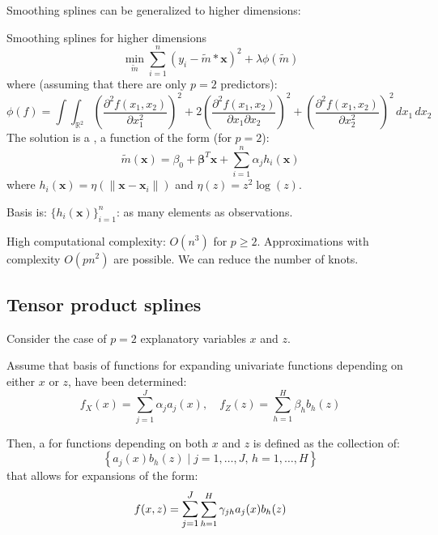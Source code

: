 Smoothing splines can be generalized to higher dimensions:
\begin{problem}{Smoothing splines for higher dimensions}{}
    \begin{equation*}
        \min_{\tilde m} \sum_{i=1}^n  \left( y_i - \tilde m*\boldsymbol x \right)^2 + \lambda \phi (\tilde m)
    \end{equation*}
    where (assuming that there are only $p=2$ predictors):
    \begin{equation*}
        \phi(f) = \int \int_{\mathbb R^2}
            \left( \frac{\partial^2 f(x_1, x_2)}{\partial x_1^2} \right)^2
            + 2 \left( \frac{\partial^2 f(x_1, x_2)}{\partial x_1 \partial x_2} \right)^2
            + \left( \frac{\partial^2 f(x_1, x_2)}{\partial x_2^2} \right)^2
            \, dx_1 \, dx_2
    \end{equation*}
    \tcblower
    The solution is a , a function of the form (for $p=2$):
    \begin{equation*}
        \tilde m (\boldsymbol x) = \beta_0 + \boldsymbol\beta^T \boldsymbol x
        + \sum_{i=1}^n \alpha_jh_i(\boldsymbol x)
    \end{equation*}
    where $h_i(\boldsymbol x) = \eta \left( \lVert \boldsymbol x - \boldsymbol x_i \rVert \right)$
    and $\eta(z) = z^2 \log(z)$.

    Basis is: $\{h_i(\boldsymbol x)\}_{i=1}^n$: as many elements as observations.

    \begin{note}
        High computational complexity: $O(n^3)$ for $p \geq 2$. Approximations
        with complexity $O(pn^2)$ are possible. We can reduce the number of
        knots.
    \end{note}
\end{problem}

\subsection{Tensor product splines}
Consider the case of $p=2$ explanatory variables $x$ and $z$.

Assume that basis of functions for expanding univariate functions depending on either
$x$ or $z$, have been determined:
\begin{equation*}
    f_X(x) = \sum_{j=1}^J \alpha_ja_j(x),\quad f_Z(z) = \sum_{h=1}^H \beta_hb_h(z)
\end{equation*}

Then, a  for functions depending on both $x$ and $z$ is
defined as the collection of:
\begin{equation*}
    \left\{
        a_j(x) b_h(z) \mid j=1,\ldots,J,\, h=1,\ldots,H
    \right\}
\end{equation*}
that allows for expansions of the form:
\begin{equation*}
    f(x,z) = \mathlarger{\sum_{j=1}^J} \sum_{h=1}^H \gamma_{jh} a_j(x) b_h(z)
\end{equation*}

